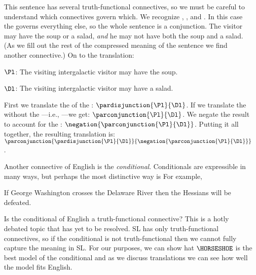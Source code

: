 \noindent{}This sentence has several truth-functional connectives, so we must be careful to understand which connectives govern which.  We recognize , , and .  In this case the  governs everything else, so the whole sentence is a conjunction.  The visitor may have the soup or a salad, \emph{and} he may not have both the soup and a salad.  (As we fill out the rest of the compressed meaning of the sentence we find another connective.)  On to the translation:

	\begin{description}[itemsep=0em]
		\item[Translation Key:] \hfill{} 
		\begin{description}[itemsep=0em]
			\item $\Pl$: The visiting intergalactic visitor may have the soup.
			\item $\Dl$: The visiting intergalactic visitor may have a salad.
		\end{description} 
	\end{description}

\noindent{}First we translate the  of the : $\pardisjunction{\Pl}{\Dl}$.  If we translate the  without the ---i.e., ---we get: $\parconjunction{\Pl}{\Dl}$.  We negate the result to account for the : $\negation{\parconjunction{\Pl}{\Dl}}$.  Putting it all together, the resulting translation is: $\parconjunction{\pardisjunction{\Pl}{\Dl}}{\negation{\parconjunction{\Pl}{\Dl}}}$.

Another connective of English is the \emph{conditional}.  Conditionals are expressible in many ways, but perhaps the most distinctive way is   For example,

\begin{menumerate}
	\item If George Washington crosses the Delaware River then the Hessians will be defeated.
\end{menumerate}

\noindent{}Is the conditional of English a truth-functional connective?  This is a hotly debated topic that has yet to be resolved.  SL has only truth-functional connectives, so if the conditional is not truth-functional then we cannot fully capture the meaning in SL.  For our purposes, we can show hat $\HORSESHOE$ is the best model of the conditional and as we discuss translations we can see how well the model fits English.

